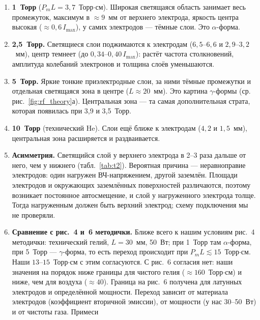 \documentclass[12pt,a4paper]{article}
\begin{document}
\begin{enumerate}
  \item \textbf{1~Торр} ($P_m L = 3{,}7$~Торр$\cdot$см). Широкая
        светящаяся область занимает весь промежуток, максимум в
        $\approx 9$~мм от верхнего электрода, яркость центра высокая
        ($\approx 0{,}6\,I_\text{max}$), у самих электродов --- тёмные слои.
        Это $\alpha$-форма.
  \item \textbf{2,5~Торр.} Светящиеся слои поджимаются к электродам
        ($6{,}5$--$6{,}6$ и $2{,}9$--$3{,}2$~мм), центр темнеет (до
        $0{,}34$--$0{,}40\,I_\text{max}$): растёт частота столкновений,
        амплитуда колебаний электронов и толщина слоёв уменьшаются.
  \item \textbf{5~Торр.} Яркие тонкие приэлектродные слои, за ними тёмные
        промежутки и отдельная светящаяся зона в центре ($L\approx 20$~мм).
        Это картина $\gamma$-формы (ср. рис.~\ref{fig:rf_theory}а).
        Центральная зона --- та самая дополнительная страта, которая
        появилась при 3,9 и 3,5~Торр.
  \item \textbf{10~Торр} (технический He). Слои ещё ближе к электродам
        ($4{,}2$ и $1{,}5$~мм), центральная зона расширяется и
        раздваивается.
  \item \textbf{Асимметрия.} Светящийся слой у верхнего электрода в
        2--3 раза дальше от него, чем у нижнего (табл.~\ref{tab:t2}). Вероятная причина ---
        неравноправие электродов: один нагружен ВЧ-напряжением, другой
        заземлён. Площади электродов и окружающих заземлённых
        поверхностей различаются, поэтому возникает постоянное
        автосмещение, и слой у нагруженного электрода толще. Тогда
        нагруженным должен быть верхний электрод; схему подключения мы
        не проверяли.
  \item \textbf{Сравнение с рис.~4 и~6 методички.} Ближе всего к нашим
        условиям рис.~4 методички: технический гелий, $L = 30$~мм,
        50~Вт; при 1~Торр там $\alpha$-форма, при 5~Торр --- $\gamma$-форма,
        то есть переход происходит при $P_m L \lesssim 15$~Торр$\cdot$см.
        Наши $13$--$15$~Торр$\cdot$см с этим согласуются. С рис.~6
        согласия нет: наши значения на порядок ниже границы для чистого
        гелия ($\approx 160$~Торр$\cdot$см) и ниже, чем для воздуха
        ($\approx 40$). Граница на рис.~6 получена для латунных электродов
        и определённой мощности.
        Переход зависит от материала электродов (коэффициент вторичной
        эмиссии), от мощности (у нас 30--50~Вт) и от чистоты газа. Примеси

\end{enumerate}
\end{document}
